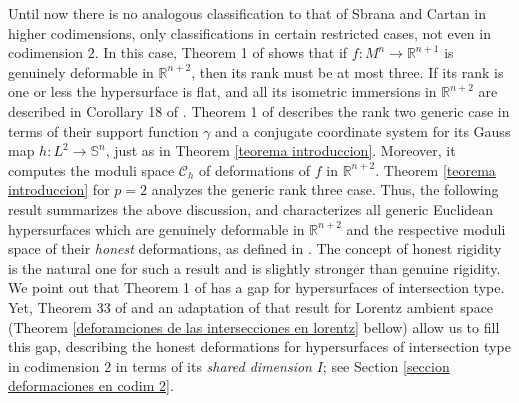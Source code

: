 \documentclass{article}
\theoremstyle{remark}
\begin{document}
Until now there is no analogous classification to that of Sbrana and Cartan in higher codimensions, only classifications in certain restricted cases, not even in codimension $2$. In this case, Theorem 1 of \cite{DF3} shows that if $f:M^n\rightarrow\mathbb{R}^{n+1}$ is genuinely deformable in $\mathbb{R}^{n+2}$, then its rank must be at most three. If its rank is one or less the hypersurface is flat, and all its isometric immersions in $\mathbb{R}^{n+2}$ are described in Corollary 18 of \cite{FF}. Theorem 1 of \cite{DFT} describes the rank two generic case in terms of their support function $\gamma$ and a conjugate coordinate system for its Gauss map $h:L^2\rightarrow\mathbb{S}^n$, just as in Theorem \ref{teorema introduccion}. Moreover, it computes the moduli space $\mathcal{C}_h$ of deformations of $f$ in $\mathbb{R}^{n+2}$. Theorem \ref{teorema introduccion} for $p=2$ analyzes the generic rank three case.
Thus, the following result summarizes the above discussion, and characterizes all generic Euclidean hypersurfaces which are genuinely deformable in $\mathbb{R}^{n+2}$  and the respective moduli space of their {\it honest} deformations, as defined in \cite{FF}. The concept of honest rigidity is the natural one for such a result and is slightly stronger than genuine rigidity.
We point out that Theorem 1 of \cite{DFT} has a gap for hypersurfaces of intersection type. Yet, Theorem 33 of \cite{FF} and an adaptation of that result for Lorentz ambient space (Theorem \ref{deforamciones de las intersecciones en lorentz} bellow) allow us to fill this gap, describing the honest deformations for hypersurfaces of intersection type in codimension $2$ in terms of its {\it shared dimension} $I$; see Section \ref{seccion deformaciones en codim 2}. 
\end{document}
